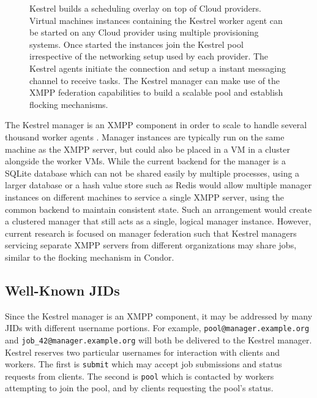 %
\begin{figure}
\caption{\label{fig:Kestrel-Arch} Kestrel builds a scheduling overlay on top
of Cloud providers. Virtual machines instances containing the Kestrel
worker agent can be started on any Cloud provider using multiple provisioning
systems. Once started the instances join the Kestrel pool irrespective
of the networking setup used by each provider. The Kestrel agents
initiate the connection and setup a instant messaging channel to receive
tasks. The Kestrel manager can make use of the XMPP federation capabilities
to build a scalable pool and establish flocking mechanisms.}

\end{figure}


The Kestrel manager is an XMPP component in order to scale to handle
several thousand worker agents \cite{Moffitt2008}. Manager instances
are typically run on the same machine as the XMPP server, but could
also be placed in a VM in a cluster alongside the worker VMs. While
the current backend for the manager is a SQLite \cite{sqlite} database
which can not be shared easily by multiple processes, using a larger
database or a hash value store such as Redis \cite{Redis} would allow
multiple manager instances on different machines to service a single
XMPP server, using the common backend to maintain consistent state.
Such an arrangement would create a clustered manager that still acts
as a single, logical manager instance. However, current research is
focused on manager federation such that Kestrel managers servicing
separate XMPP servers from different organizations may share jobs,
similar to the flocking mechanism in Condor.


\subsection{Well-Known JIDs}

\label{sec:Kestrel:JIDs} Since the Kestrel manager is an XMPP component,
it may be addressed by many JIDs with different username portions.
For example, \texttt{pool@manager.example.org} and \texttt{job\_42@manager.example.org}
will both be delivered to the Kestrel manager. Kestrel reserves two
particular usernames for interaction with clients and workers. The
first is \texttt{submit} which may accept job submissions and status
requests from clients. The second is \texttt{pool} which is contacted
by workers attempting to join the pool, and by clients requesting
the pool's status.

